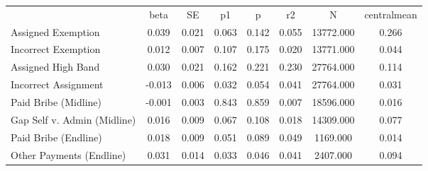 {\def\sym#1{\ifmmode^{#1}\else\(^{#1}\)\fi} \begin{tabular}{l*{7}{c}} \hline\hline 
& beta & SE & p1 & p & r2 & N & centralmean \\
Assigned Exemption & 0.039 & 0.021 & 0.063 & 0.142 & 0.055 & 13772.000 & 0.266 \\
Incorrect Exemption & 0.012 & 0.007 & 0.107 & 0.175 & 0.020 & 13771.000 & 0.044 \\
Assigned High Band & 0.030 & 0.021 & 0.162 & 0.221 & 0.230 & 27764.000 & 0.114 \\
Incorrect Assignment & -0.013 & 0.006 & 0.032 & 0.054 & 0.041 & 27764.000 & 0.031 \\
Paid Bribe (Midline) & -0.001 & 0.003 & 0.843 & 0.859 & 0.007 & 18596.000 & 0.016 \\
Gap Self v. Admin (Midline) & 0.016 & 0.009 & 0.067 & 0.108 & 0.018 & 14309.000 & 0.077 \\
Paid Bribe (Endline) & 0.018 & 0.009 & 0.051 & 0.089 & 0.049 & 1169.000 & 0.014 \\
Other Payments (Endline) & 0.031 & 0.014 & 0.033 & 0.046 & 0.041 & 2407.000 & 0.094 \\
\hline\hline \end{tabular} }
